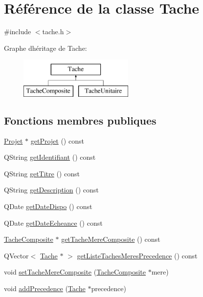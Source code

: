 \hypertarget{class_tache}{}\section{Référence de la classe Tache}
\label{class_tache}


{\ttfamily \#include $<$tache.\+h$>$}

Graphe d\textquotesingle{}héritage de Tache\+:\begin{figure}[H]
\begin{center}
\leavevmode
\includegraphics[height=2.000000cm]{class_tache}
\end{center}
\end{figure}
\subsection*{Fonctions membres publiques}
\begin{DoxyCompactItemize}
\item 
\hyperlink{class_projet}{Projet} $\ast$ \hyperlink{class_tache_aa6d1abc3712b5a8b571bb3c131129ac7}{get\+Projet} () const 
\item 
Q\+String \hyperlink{class_tache_aff63994ef1fe1b96cf14540f954e45c0}{get\+Identifiant} () const 
\item 
Q\+String \hyperlink{class_tache_ab9e56c6eaaa23d2c66148ff5a89724e6}{get\+Titre} () const 
\item 
Q\+String \hyperlink{class_tache_a02954f46ea1310fb0d5ceceeb94298cc}{get\+Description} () const 
\item 
Q\+Date \hyperlink{class_tache_a5f7e485d64f7e72042e1f0ad5f378df4}{get\+Date\+Dispo} () const 
\item 
Q\+Date \hyperlink{class_tache_ad44bf074be085367c3a58b81be680d70}{get\+Date\+Echeance} () const 
\item 
\hyperlink{class_tache_composite}{Tache\+Composite} $\ast$ \hyperlink{class_tache_a5d8c5f16db0287ed0539c9206f244e02}{get\+Tache\+Mere\+Composite} () const 
\item 
Q\+Vector$<$ \hyperlink{class_tache}{Tache} $\ast$ $>$ \hyperlink{class_tache_afa1e10f04b303908477feee22241820f}{get\+Liste\+Taches\+Meres\+Precedence} () const 
\item 
void \hyperlink{class_tache_ad5ed4f92ccbc0895813908c750d918a2}{set\+Tache\+Mere\+Composite} (\hyperlink{class_tache_composite}{Tache\+Composite} $\ast$mere)
\item 
void \hyperlink{class_tache_a10659477f457bc4ceafbee41b155eb66}{add\+Precedence} (\hyperlink{class_tache}{Tache} $\ast$precedence)
\end{DoxyCompactItemize}

